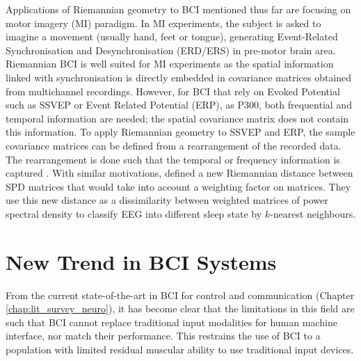 
Applications of Riemannian geometry to BCI mentioned thus far are focusing on motor imagery (MI) paradigm.
In MI experiments, the subject is asked to imagine a movement (usually hand, feet or tongue), generating Event-Related Synchronisation and Desynchronisation (ERD/ERS) in pre-motor brain area.
Riemannian BCI is well suited for MI experiments as the spatial information linked with synchronisation is directly embedded in covariance matrices obtained from multichannel recordings.
However, for BCI that rely on Evoked Potential such as SSVEP or Event Related Potential (ERP), as P300, both frequential and temporal information are needed; the spatial covariance matrix does not contain this information. 
To apply Riemannian geometry to SSVEP and ERP, the sample covariance matrices can be defined from a rearrangement of the recorded data. 
The rearrangement is done such that the temporal or frequency information is captured \citep{congedo_new_2013}. 
With similar motivations, \cite{li_eeg_2009, li_electroencephalogram_2012} defined a new Riemannian distance between SPD matrices that would take into account a weighting factor on matrices. 
They use this new distance as a dissimilarity between weighted matrices of power spectral density to classify EEG into different sleep state by $k$-nearest neighbours. 

\section{New Trend in BCI Systems}
\label{sec:new_trends_BCI}
From the current state-of-the-art in BCI for control and communication (Chapter \ref{chap:lit_survey_neuro}), it has become clear that the limitations in this field are such that BCI cannot replace traditional input modalities for human machine interface, nor match their performance.
This restrains the use of BCI to a population with limited residual muscular ability to use traditional input devices.

